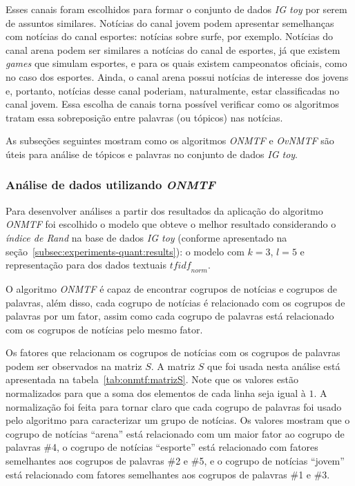 \documentclass[
    12pt,                %
    oneside,            %
    a4paper,            %
    english,            %
    brazil                %
    ]{abntex2ppgsi}
\begin{document}
Esses canais foram escolhidos para formar o conjunto de dados \textit{IG toy} por serem de assuntos similares. Notícias do canal jovem podem apresentar semelhanças com notícias do canal esportes: notícias sobre surfe, por exemplo. Notícias do canal arena podem ser similares a notícias do canal de esportes, já que existem \textit{games} que simulam esportes, e para os quais existem campeonatos oficiais, como no caso dos esportes. Ainda, o canal arena possui notícias de interesse dos jovens e, portanto, notícias desse canal poderiam, naturalmente, estar classificadas no canal jovem. Essa escolha de canais torna possível verificar como os algoritmos tratam essa sobreposição entre palavras (ou tópicos) nas notícias.

As subseções seguintes mostram como os algoritmos \textit{ONMTF} e \textit{OvNMTF} são úteis para análise de tópicos e palavras no conjunto de dados \textit{IG toy}.

\subsubsection{Análise de dados utilizando \textit{ONMTF}}

Para desenvolver análises a partir dos resultados da aplicação do algoritmo \textit{ONMTF} foi escolhido o modelo que obteve o melhor resultado considerando o \textit{índice de Rand} na base de dados \textit{IG toy} (conforme apresentado na seção~\ref{subsec:experiments-quant:results}): o modelo com $k = 3$, $l = 5$ e representação para dos dados textuais $\textit{tfidf}_{norm}$.

O algoritmo \textit{ONMTF} é capaz de encontrar cogrupos de notícias e cogrupos de palavras, além disso, cada cogrupo de notícias é relacionado com os cogrupos de palavras por um fator, assim como cada cogrupo de palavras está relacionado com os cogrupos de notícias pelo mesmo fator.

Os fatores que relacionam os cogrupos de notícias com os cogrupos de palavras podem ser observados na matriz $S$. A matriz $S$ que foi usada nesta análise está apresentada na tabela~\ref{tab:onmtf:matrizS}. Note que os valores estão normalizados para que a soma dos elementos de cada linha seja igual à $1$. A normalização foi feita para tornar claro que cada cogrupo de palavras foi usado pelo algoritmo para caracterizar um grupo de notícias. Os valores mostram que o cogrupo de notícias ``arena'' está relacionado com um maior fator ao cogrupo de palavras \#4, o cogrupo de notícias ``esporte'' está relacionado com fatores semelhantes aos cogrupos de palavras \#2 e \#5, e o cogrupo de notícias ``jovem'' está relacionado com fatores semelhantes aos cogrupos de palavras \#1 e \#3.
\end{document}
